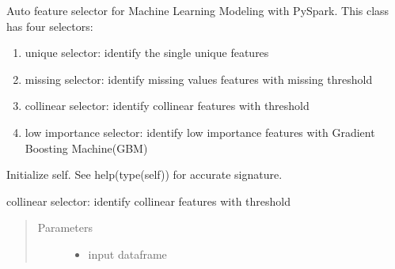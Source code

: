 \documentclass[letterpaper,11pt,english]{sphinxmanual}
\begin{document}
\begin{fulllineitems}
Auto feature selector for Machine Learning Modeling with PySpark. This class has four selectors:
\begin{enumerate}
\def\theenumi{\arabic{enumi}}
\def\labelenumi{\theenumi .}
\makeatletter\def\p@enumii{\p@enumi \theenumi .}\makeatother
\item {} 
unique selector: identify the single unique features

\item {} 
missing selector: identify missing values features with missing threshold

\item {} 
collinear selector: identify collinear features with threshold

\item {} 
low importance selector: identify low importance features with Gradient Boosting Machine(GBM)

\end{enumerate}

\begin{fulllineitems}
\label{\detokenize{auto_feature:AutoFeatures.AutoFeatures.__init__}}
Initialize self.  See help(type(self)) for accurate signature.

\end{fulllineitems}


\begin{fulllineitems}
\label{\detokenize{auto_feature:AutoFeatures.AutoFeatures.corr_selector}}
collinear selector: identify collinear features with threshold
\begin{quote}\begin{description}
\item[{Parameters}] \leavevmode\begin{itemize}
\item {} 
 \textendash{} input dataframe


\end{itemize}
\end{description}
\end{quote}
\end{fulllineitems}
\end{fulllineitems}
\end{document}
